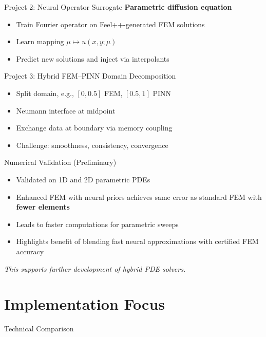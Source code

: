 \documentclass{beamer}
\begin{document}
\begin{frame}{Project 2: Neural Operator Surrogate}
  \textbf{Parametric diffusion equation}
  \begin{itemize}
    \item Train Fourier operator on Feel++-generated FEM solutions
    \item Learn mapping \( \mu \mapsto u(x,y;\mu) \)
    \item Predict new solutions and inject via interpolants
  \end{itemize}
\end{frame}

\begin{frame}{Project 3: Hybrid FEM–PINN Domain Decomposition}
  \begin{itemize}
    \item Split domain, e.g., \([0, 0.5]\) FEM, \([0.5, 1]\) PINN
    \item Neumann interface at midpoint
    \item Exchange data at boundary via memory coupling
    \item Challenge: smoothness, consistency, convergence
  \end{itemize}
\end{frame}

\begin{frame}{Numerical Validation (Preliminary)}
\begin{itemize}
  \item Validated on 1D and 2D parametric PDEs
  \item Enhanced FEM with neural priors achieves same error as standard FEM with \textbf{fewer elements}
  \item Leads to faster computations for parametric sweeps
  \item Highlights benefit of blending fast neural approximations with certified FEM accuracy
\end{itemize}

\vspace{0.5em}
\textit{This supports further development of hybrid PDE solvers.}
\end{frame}

\section{Implementation Focus}

\begin{frame}{Technical Comparison}
\end{frame}
\end{document}
